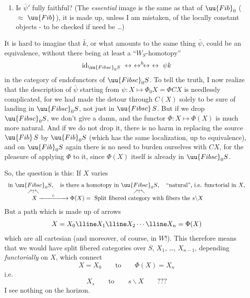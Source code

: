 \begin{enumerate}[leftmargin=*]
\item[$3^o$)] Is $\bar{\psi}'$ fully faithful? (The \textit{essential} image is the same as that of $\uu{Fib}_0$ ($\approx$ $\uu{Fib}$), it is made up, unless I am mistaken, of the locally constant objects - to be checked if need be \dots)
\end{enumerate}


It is hard to imagine that $\bar{k}$, or what amounts to the same thing $\bar{\psi}$, could be an equivalence, without there being at least a ``$W_S$-homotopy''
\[
\mathrm{id}_{\uu{Fibsc}_0 S} \ \leftrightarrow\ \leftrightarrow^{h}\!\leftrightarrow\ \leftrightarrow\ \psi k
\]
in the category of endofunctors of $\uu{Fibsc}_0 S$. To tell the truth, I now realize that the description of $\bar{\psi}$ starting from $\psi : X \longmapsto \Phi_0 X = \Phi C X$ is needlessly complicated, for we had made the detour through $C(X)$ solely to be sure of landing in $\uu{Fibsc}_0 S$, not just in $\uu{Fibsc}\, S$. But if we drop $\uu{Fibsc}_0 S$, we don't give a damn, and the functor $\Phi : X \longmapsto \Phi(X)$ is much more natural. And if we do not drop it, there is no harm in replacing the source $\uu{Fib}\, S$ by $\uu{Fib}_0 S$ (which has the same localization, up to equivalence), and on $\uu{Fib}_0 S$ again there is no need to burden ourselves with $CX$, for the pleasure of applying $\Phi$ to it, since $\Phi(X)$ itself is already in $\uu{Fibsc}_0 S$.

So, the question is this: If $X$ varies
\[
\begin{array}{l}
\text{in } \underset{\nearrow\uparrow\nwarrow}{\uu{Fibsc}_0 S}, \quad \text{is there a homotopy in } \underset{\nearrow\uparrow\nwarrow}{\uu{Fibsc}_0 S}, \quad \text{``natural'', i.e. functorial in } X, \\[2ex]
\qquad\qquad X \xrightarrow{\qquad c \qquad} \Phi(X) = \ \text{Split fibered category with fibers the } s\backslash X
\end{array}
\]
But a path which is made up of arrows
\[
X = X_0 \lline X_1 \lline X_2 \cdots \lline X_n = \Phi(X)
\]
which are all cartesian (and moreover, of course, in $W$!). This therefore means that we would have split fibered categories over $S$, $X_1$, \dots, $X_{n-1}$, depending \textit{functorially} on $X$, which connect
\[
X = X_0 \qquad \text{to} \qquad \Phi(X) = X_n
\]
i.e.
\[
X_s \qquad \text{to} \qquad s\backslash X \qquad \text{???}
\]
I see nothing on the horizon.